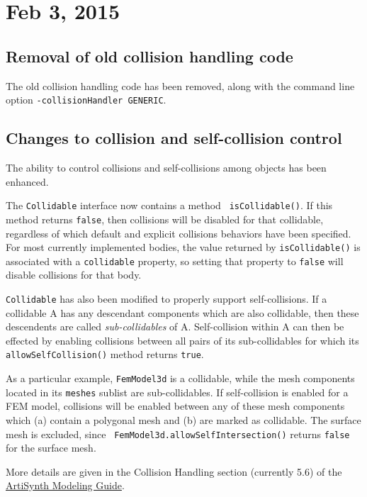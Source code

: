 \documentclass{article}
\begin{document}
\section*{Feb 3, 2015}

\subsection*{Removal of old collision handling code}

The old collision handling code has been removed, along with the
command line option {\tt -collisionHandler GENERIC}.

\subsection*{Changes to collision and self-collision control}

The ability to control collisions and self-collisions among objects
has been enhanced.

The {\tt Collidable} interface now contains a method {\tt
isCollidable()}. If this method returns {\tt false}, then collisions
will be disabled for that collidable, regardless of which default and
explicit collisions behaviors have been specified. For most currently
implemented bodies, the value returned by {\tt isCollidable()} is
associated with a {\tt collidable} property, so setting that property
to {\tt false} will disable collisions for that body.

{\tt Collidable} has also been modified to properly support
self-collisions.  If a collidable A has any descendant components
which are also collidable, then these descendents are called {\it
sub-collidables} of A. Self-collision within A can then be effected by
enabling collisions between all pairs of its sub-collidables for which
its {\tt allowSelfCollision()} method returns {\tt true}.

As a particular example, {\tt FemModel3d} is a collidable, while the
mesh components located in its {\tt meshes} sublist are
sub-collidables. If self-collision is enabled for a FEM model,
collisions will be enabled between any of these mesh components which
(a) contain a polygonal mesh and (b) are marked as collidable. The
surface mesh is excluded, since {\tt
FemModel3d.allowSelfIntersection()} returns {\tt false} for the surface
mesh.

More details are given in the Collision Handling section (currently
5.6) of the
\href{http://www.artisynth.org/doc/html/modelguide/modelguide.html}%
{ArtiSynth Modeling Guide}.
\end{document}
